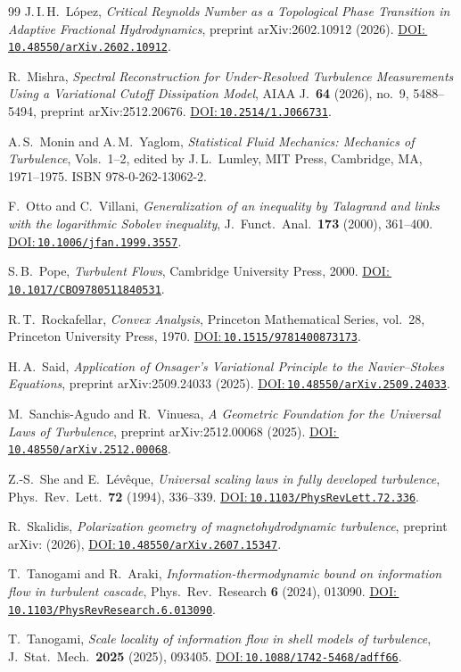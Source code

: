\documentclass[12pt,a4paper]{article}
\newcommand{\doilink}[1]{\href{https://doi.org/#1}{DOI:\,\nolinkurl{#1}}}
\theoremstyle{definition}
\theoremstyle{plain}
\theoremstyle{remark}
\begin{document}
\begin{thebibliography}{99}
J.\,I.\,H.~López,
\emph{Critical Reynolds Number as a Topological Phase Transition in Adaptive Fractional Hydrodynamics},
preprint arXiv:2602.10912 (2026).
\doilink{10.48550/arXiv.2602.10912}.

R.~Mishra,
\emph{Spectral Reconstruction for Under-Resolved Turbulence Measurements Using a Variational Cutoff Dissipation Model},
AIAA J.\ \textbf{64} (2026), no.~9, 5488--5494,
preprint arXiv:2512.20676.
\doilink{10.2514/1.J066731}.

A.\,S.~Monin and A.\,M.~Yaglom,
\emph{Statistical Fluid Mechanics: Mechanics of Turbulence}, Vols.~1--2,
edited by J.\,L.~Lumley, MIT Press, Cambridge, MA, 1971--1975.
ISBN 978-0-262-13062-2.

F.~Otto and C.~Villani,
\emph{Generalization of an inequality by Talagrand and links with the logarithmic Sobolev inequality},
J.\ Funct.\ Anal.~\textbf{173} (2000), 361--400.
\doilink{10.1006/jfan.1999.3557}.

S.\,B.~Pope,
\emph{Turbulent Flows},
Cambridge University Press, 2000.
\doilink{10.1017/CBO9780511840531}.

R.\,T.~Rockafellar,
\emph{Convex Analysis},
Princeton Mathematical Series, vol.~28,
Princeton University Press, 1970.
\doilink{10.1515/9781400873173}.

H.\,A.~Said,
\emph{Application of Onsager's Variational Principle to the Navier--Stokes Equations},
preprint arXiv:2509.24033 (2025).
\doilink{10.48550/arXiv.2509.24033}.

M.~Sanchis-Agudo and R.~Vinuesa,
\emph{A Geometric Foundation for the Universal Laws of Turbulence},
preprint arXiv:2512.00068 (2025).
\doilink{10.48550/arXiv.2512.00068}.

Z.-S.~She and E.~Lévêque,
\emph{Universal scaling laws in fully developed turbulence},
Phys.\ Rev.\ Lett.\ \textbf{72} (1994), 336--339.
\doilink{10.1103/PhysRevLett.72.336}.

R.~Skalidis,
\emph{Polarization geometry of mag\-ne\-to\-hy\-dro\-dy\-nam\-ic turbulence},
preprint arXiv: (2026),
\doilink{10.48550/arXiv.2607.15347}.

T.~Tanogami and R.~Araki,
\emph{Information-thermodynamic bound on information flow in turbulent cascade},
Phys.\ Rev.\ Research \textbf{6} (2024), 013090.
\doilink{10.1103/PhysRevResearch.6.013090}.

T.~Tanogami,
\emph{Scale locality of information flow in shell models of turbulence},
J.\ Stat.\ Mech.\ \textbf{2025} (2025), 093405.
\doilink{10.1088/1742-5468/adff66}.

\end{thebibliography}
\endgroup
\end{document}
